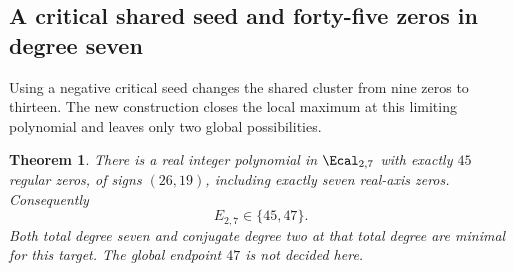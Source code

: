 \documentclass[UTF8,11pt]{ctexart}
\newtheorem{thm}{Theorem}[section]
\theoremstyle{definition}
\numberwithin{equation}{section}
\begin{document}
\subsection{A critical shared seed and forty-five zeros in degree seven}
\label{v43:sec:45}

Using a negative critical seed changes the shared cluster from nine
zeros to thirteen. The new construction closes the local maximum
at this limiting polynomial and leaves only two global possibilities.

\begin{thm}\label{v43:thm:45}
There is a real integer polynomial in $\Ecal_{2,7}$ with exactly
$45$ regular zeros, of signs $(26,19)$, including exactly seven
real-axis zeros. Consequently
\begin{equation}\label{v43:eq:45}
                              E_{2,7}\in\{45,47\}.
\end{equation}
Both total degree seven and conjugate degree two at that total
degree are minimal for this target. The global endpoint $47$
is not decided here.
\end{thm}
\end{document}
